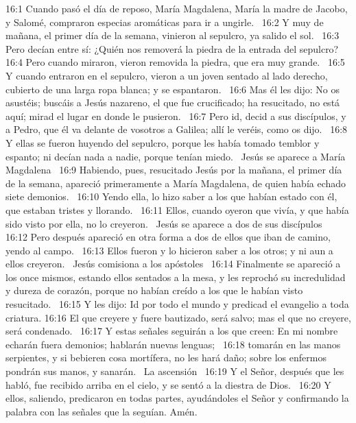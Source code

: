 16:1 Cuando pasó el día de reposo, María Magdalena, María la madre de Jacobo, y Salomé, compraron especias aromáticas para ir a ungirle.  
16:2 Y muy de mañana, el primer día de la semana, vinieron al sepulcro, ya salido el sol.  
16:3 Pero decían entre sí: ¿Quién nos removerá la piedra de la entrada del sepulcro?  
16:4 Pero cuando miraron, vieron removida la piedra, que era muy grande.  
16:5 Y cuando entraron en el sepulcro, vieron a un joven sentado al lado derecho, cubierto de una larga ropa blanca; y se espantaron.  
16:6 Mas él les dijo: No os asustéis; buscáis a Jesús nazareno, el que fue crucificado; ha resucitado, no está aquí; mirad el lugar en donde le pusieron.  
16:7 Pero id, decid a sus discípulos, y a Pedro, que él va delante de vosotros a Galilea; allí le veréis, como os dijo.  
16:8 Y ellas se fueron huyendo del sepulcro, porque les había tomado temblor y espanto; ni decían nada a nadie, porque tenían miedo.  
Jesús se aparece a María Magdalena   
16:9 Habiendo, pues, resucitado Jesús por la mañana, el primer día de la semana, apareció primeramente a María Magdalena, de quien había echado siete demonios.  
16:10 Yendo ella, lo hizo saber a los que habían estado con él, que estaban tristes y llorando.  
16:11 Ellos, cuando oyeron que vivía, y que había sido visto por ella, no lo creyeron.  
Jesús se aparece a dos de sus discípulos   
16:12 Pero después apareció en otra forma a dos de ellos que iban de camino, yendo al campo.  
16:13 Ellos fueron y lo hicieron saber a los otros; y ni aun a ellos creyeron.  
Jesús comisiona a los apóstoles   
16:14 Finalmente se apareció a los once mismos, estando ellos sentados a la mesa, y les reprochó su incredulidad y dureza de corazón, porque no habían creído a los que le habían visto resucitado.  
16:15 Y les dijo: Id por todo el mundo y predicad el evangelio a toda criatura. 
16:16 El que creyere y fuere bautizado, será salvo; mas el que no creyere, será condenado.  
16:17 Y estas señales seguirán a los que creen: En mi nombre echarán fuera demonios; hablarán nuevas lenguas;  
16:18 tomarán en las manos serpientes, y si bebieren cosa mortífera, no les hará daño; sobre los enfermos pondrán sus manos, y sanarán.  
La ascensión   
16:19 Y el Señor, después que les habló, fue recibido arriba en el cielo, y se sentó a la diestra de Dios.  
16:20 Y ellos, saliendo, predicaron en todas partes, ayudándoles el Señor y confirmando la palabra con las señales que la seguían. Amén. 